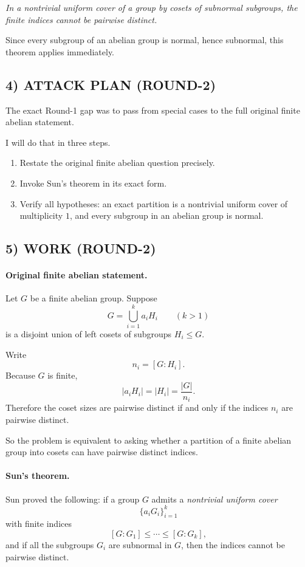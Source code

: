 \medskip
\centerline{\emph{In a nontrivial uniform cover of a group by cosets of subnormal subgroups, the finite indices cannot be pairwise distinct.}}
\medskip

Since every subgroup of an abelian group is normal, hence subnormal, this theorem applies immediately.

\subsection*{4) ATTACK PLAN (ROUND-2)}

The exact Round-1 gap was to pass from special cases to the full original finite abelian statement.

I will do that in three steps.

\begin{enumerate}
\item Restate the original finite abelian question precisely.
\item Invoke Sun's theorem in its exact form.
\item Verify all hypotheses: an exact partition is a nontrivial uniform cover of multiplicity $1$, and every subgroup in an abelian group is normal.
\end{enumerate}

\subsection*{5) WORK (ROUND-2)}

\paragraph{Original finite abelian statement.}
Let $G$ be a finite abelian group.  Suppose
\[
G=\bigcup_{i=1}^k a_iH_i
\qquad (k>1)
\]
is a disjoint union of left cosets of subgroups $H_i\le G$.

Write
\[
n_i=[G:H_i].
\]
Because $G$ is finite,
\[
|a_iH_i|=|H_i|=\frac{|G|}{n_i}.
\]
Therefore the coset sizes are pairwise distinct if and only if the indices $n_i$ are pairwise distinct.

So the problem is equivalent to asking whether a partition of a finite abelian group into cosets can have pairwise distinct indices.

\paragraph{Sun's theorem.}
Sun proved the following: if a group $G$ admits a \emph{nontrivial uniform cover}
\[
\{a_iG_i\}_{i=1}^k
\]
with finite indices
\[
[G:G_1]\le \cdots \le [G:G_k],
\]
and if all the subgroups $G_i$ are subnormal in $G$, then the indices cannot be pairwise distinct.

